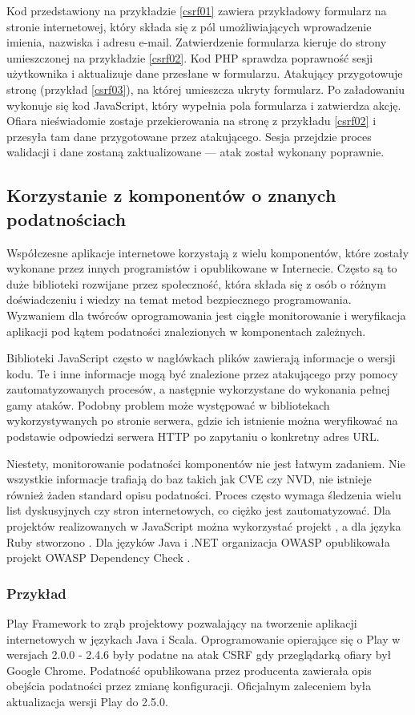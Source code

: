 \documentclass[11pt,a4paper,polish,thesis,oneside]{dcsbook}
\begin{document}
Kod przedstawiony na przykładzie \ref{csrf01} zawiera przykładowy formularz na stronie internetowej, który składa się z pól umożliwiających wprowadzenie imienia, nazwiska i adresu e-mail. Zatwierdzenie formularza kieruje do strony umieszczonej na przykładzie \ref{csrf02}. Kod PHP sprawdza poprawność sesji użytkownika i aktualizuje dane przesłane w formularzu. Atakujący przygotowuje stronę (przykład \ref{csrf03}), na której umieszcza ukryty formularz. Po załadowaniu wykonuje się kod JavaScript, który wypełnia pola formularza i zatwierdza akcję. Ofiara nieświadomie zostaje przekierowania na stronę z przykładu \ref{csrf02} i przesyła tam dane przygotowane przez atakującego. Sesja przejdzie proces walidacji i dane zostaną zaktualizowane --- atak został wykonany poprawnie.

\subsection{Korzystanie z komponentów o znanych podatnościach}
Współczesne aplikacje internetowe korzystają z wielu komponentów, które zostały wykonane przez innych programistów i opublikowane w Internecie. Często są to duże biblioteki rozwijane przez społeczność, która składa się z osób o różnym doświadczeniu i wiedzy na temat metod bezpiecznego programowania. Wyzwaniem dla twórców oprogramowania jest ciągłe monitorowanie i weryfikacja aplikacji pod kątem podatności znalezionych w komponentach zależnych. 

Biblioteki JavaScript często w nagłówkach plików zawierają informacje o wersji kodu. Te i inne informacje mogą być znalezione przez atakującego przy pomocy zautomatyzowanych procesów, a następnie wykorzystane do wykonania pełnej gamy ataków. Podobny problem może występować w bibliotekach wykorzystywanych po stronie serwera, gdzie ich istnienie można weryfikować na podstawie odpowiedzi serwera HTTP po zapytaniu o konkretny adres URL. 

Niestety, monitorowanie podatności komponentów nie jest łatwym zadaniem. Nie wszystkie informacje trafiają do baz takich jak CVE czy NVD, nie istnieje również żaden standard opisu podatności. Proces często wymaga śledzenia wielu list dyskusyjnych czy stron internetowych, co ciężko jest zautomatyzować. Dla projektów realizowanych w JavaScript można wykorzystać projekt \cite{nodesec}, a dla języka Ruby stworzono \cite{rubysec}. Dla języków Java i .NET organizacja OWASP opublikowała projekt OWASP Dependency Check \cite{owaspdc}.

\subsubsection*{Przykład}
Play Framework \cite{playfw} to zrąb projektowy pozwalający na tworzenie aplikacji internetowych w językach Java i Scala. Oprogramowanie opierające się o Play w wersjach 2.0.0 - 2.4.6 były podatne na atak CSRF gdy przeglądarką ofiary był Google Chrome. Podatność opublikowana przez producenta \cite{playv1} zawierała opis obejścia podatności przez zmianę konfiguracji. Oficjalnym zaleceniem była aktualizacja wersji Play do 2.5.0.
\end{document}
